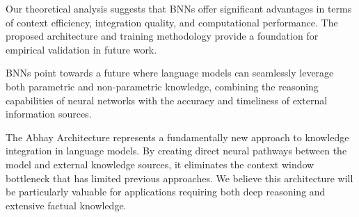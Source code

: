 \documentclass[9pt,a4paper,twocolumn,twoside]{tau-class/tau}
\begin{document}
    Our theoretical analysis suggests that BNNs offer significant advantages in terms of context efficiency, integration quality, and computational performance. The proposed architecture and training methodology provide a foundation for empirical validation in future work.

    BNNs point towards a future where language models can seamlessly leverage both parametric and non-parametric knowledge, combining the reasoning capabilities of neural networks with the accuracy and timeliness of external information sources.

\begin{info}
    The Abhay Architecture represents a fundamentally new approach to knowledge integration in language models. By creating direct neural pathways between the model and external knowledge sources, it eliminates the context window bottleneck that has limited previous approaches. We believe this architecture will be particularly valuable for applications requiring both deep reasoning and extensive factual knowledge.
\end{info}


\printbibliography

\end{document}

